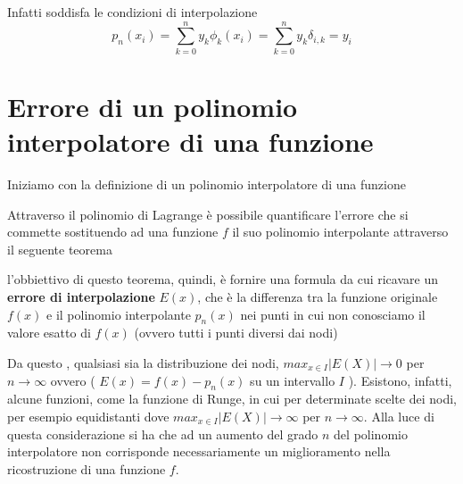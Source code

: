 Infatti soddisfa le condizioni di interpolazione
\[
    p_n(x_i)= \sum_{k=0}^n y_k\phi_k(x_i) = \sum_{k=0}^n y_k\delta_{i,k} = y_i
\]
\section{Errore di un polinomio interpolatore di una funzione}

Iniziamo con la definizione di un polinomio interpolatore di una funzione


Attraverso il polinomio di Lagrange è possibile quantificare l'errore che si commette sostituendo ad una funzione $f$ il suo polinomio interpolante attraverso il seguente teorema


l'obbiettivo di questo teorema, quindi, è fornire una formula da cui ricavare un \textbf{errore di interpolazione} $E(x)$, che è la differenza tra la funzione originale $f(x)$ e il polinomio interpolante $p_n(x)$ nei punti in cui non conosciamo il valore esatto di $f(x)$ (ovvero tutti i punti diversi dai nodi)

Da questo , qualsiasi sia la distribuzione dei
nodi, $max_{x\in I}|E(X)|\to 0$ per $n\to\infty$ ovvero ( $E(x)=f(x)-p_n(x)$ su un intervallo $I$ ). Esistono, infatti, alcune funzioni, come la funzione di
Runge, in cui per determinate scelte dei nodi, per esempio equidistanti dove  $max_{x\in I}|E(X)|\to \infty$ per $n\to\infty$. Alla luce di questa considerazione si ha che ad un aumento del grado $n$ del polinomio interpolatore non corrisponde necessariamente un miglioramento nella ricostruzione di una funzione $f$.


